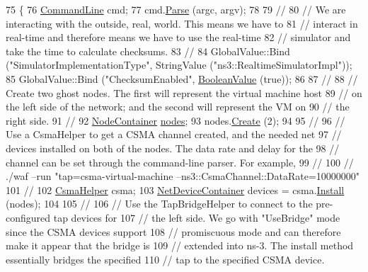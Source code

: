 \begin{DoxyCode}
75 \{
76   \hyperlink{classns3_1_1CommandLine}{CommandLine} cmd;
77   cmd.\hyperlink{classns3_1_1CommandLine_a5c10b85b3207e5ecb48d907966923156}{Parse} (argc, argv);
78 
79   \textcolor{comment}{//}
80   \textcolor{comment}{// We are interacting with the outside, real, world.  This means we have to }
81   \textcolor{comment}{// interact in real-time and therefore means we have to use the real-time}
82   \textcolor{comment}{// simulator and take the time to calculate checksums.}
83   \textcolor{comment}{//}
84   GlobalValue::Bind (\textcolor{stringliteral}{"SimulatorImplementationType"}, StringValue (\textcolor{stringliteral}{"ns3::RealtimeSimulatorImpl"}));
85   GlobalValue::Bind (\textcolor{stringliteral}{"ChecksumEnabled"}, \hyperlink{classns3_1_1BooleanValue}{BooleanValue} (\textcolor{keyword}{true}));
86 
87   \textcolor{comment}{//}
88   \textcolor{comment}{// Create two ghost nodes.  The first will represent the virtual machine host}
89   \textcolor{comment}{// on the left side of the network; and the second will represent the VM on }
90   \textcolor{comment}{// the right side.}
91   \textcolor{comment}{//}
92   \hyperlink{classns3_1_1NodeContainer}{NodeContainer} \hyperlink{visualizer-ideas_8txt_a3e1b3808014a2c68ab0cd0182e041be2}{nodes};
93   nodes.\hyperlink{classns3_1_1NodeContainer_a787f059e2813e8b951cc6914d11dfe69}{Create} (2);
94 
95   \textcolor{comment}{//}
96   \textcolor{comment}{// Use a CsmaHelper to get a CSMA channel created, and the needed net }
97   \textcolor{comment}{// devices installed on both of the nodes.  The data rate and delay for the}
98   \textcolor{comment}{// channel can be set through the command-line parser.  For example,}
99   \textcolor{comment}{//}
100   \textcolor{comment}{// ./waf --run "tap=csma-virtual-machine --ns3::CsmaChannel::DataRate=10000000"}
101   \textcolor{comment}{//}
102   \hyperlink{classns3_1_1CsmaHelper}{CsmaHelper} csma;
103   \hyperlink{classns3_1_1NetDeviceContainer}{NetDeviceContainer} devices = csma.\hyperlink{classns3_1_1CsmaHelper_af79a91372595230b0817200270ab84e7}{Install} (nodes);
104 
105   \textcolor{comment}{//}
106   \textcolor{comment}{// Use the TapBridgeHelper to connect to the pre-configured tap devices for }
107   \textcolor{comment}{// the left side.  We go with "UseBridge" mode since the CSMA devices support}
108   \textcolor{comment}{// promiscuous mode and can therefore make it appear that the bridge is }
109   \textcolor{comment}{// extended into ns-3.  The install method essentially bridges the specified}
110   \textcolor{comment}{// tap to the specified CSMA device.}

\end{DoxyCode}
